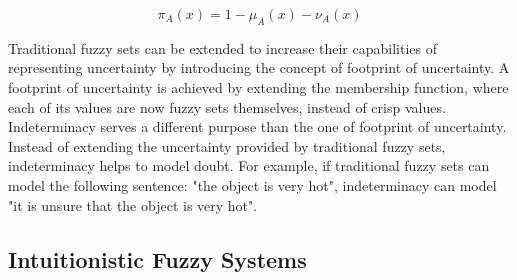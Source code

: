 \begin{equation}
  \label{eq:indeterminacy}
  \pi_{A}(x) = 1 - \mu_{A}(x) - \nu_{A}(x)
\end{equation}

Traditional fuzzy sets can be extended to increase their capabilities of representing uncertainty by introducing the concept of footprint of uncertainty. A footprint of uncertainty is achieved by extending the membership function, where each of its values are now fuzzy sets themselves, instead of crisp values. Indeterminacy serves a different purpose than the one of footprint of uncertainty. Instead of extending the uncertainty provided by traditional fuzzy sets, indeterminacy helps to model doubt. For example, if traditional fuzzy sets can model the following sentence: "the object is very hot", indeterminacy can model "it is unsure that the object is very hot".

\subsection{Intuitionistic Fuzzy Systems}
\label{subsection:intuitionistic-fuzzy-systems}

